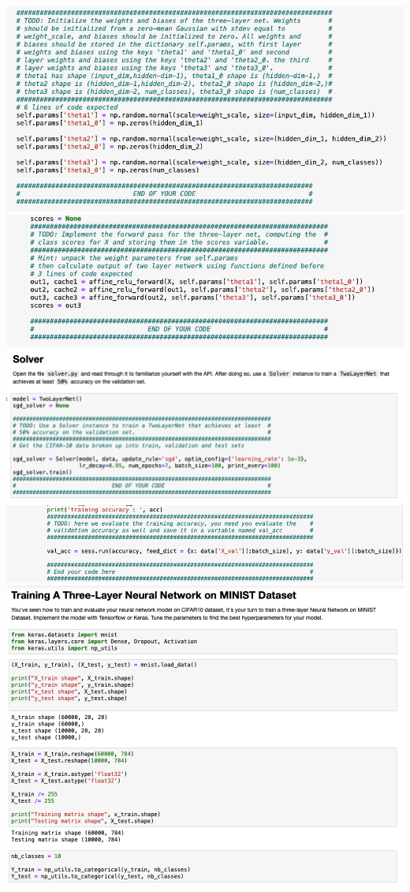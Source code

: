 \documentclass[11pt]{article}
\begin{document}
\includegraphics[scale= 0.35]{hw8-8} \\
\includegraphics[scale= 0.35]{hw8-9} \\
\includegraphics[scale= 0.35]{hw8-10} \\
\includegraphics[scale= 0.35]{hw8-11} \\
\includegraphics[scale= 0.35]{hw8-20} \\
\end{document}
